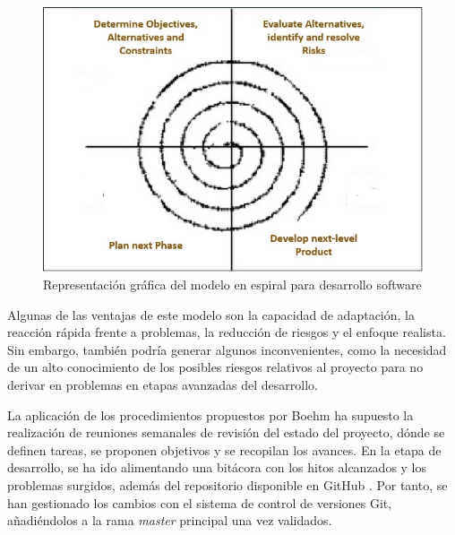 \documentclass[12pt,spanish,chapterprefix, numbers=noenddot]{book}
\numberwithin{equation}{section}
\numberwithin{figure}{section}
\begin{document}
\begin{figure}[hbt!]
\centering
\includegraphics[width=12cm]{Figs/spiral_model.jpg}
\par
\caption{\label{fig:spiralModel}Representación gráfica del modelo en espiral para desarrollo software}
\end{figure}

Algunas de las ventajas de este modelo son la capacidad de adaptación, la reacción rápida frente a problemas, la reducción de riesgos y el enfoque realista. Sin embargo, también podría generar algunos inconvenientes, como la necesidad de un alto conocimiento de los posibles riesgos relativos al proyecto para no derivar en problemas en etapas avanzadas del desarrollo. 

La aplicación de los procedimientos propuestos por Boehm ha supuesto la realización de reuniones semanales de revisión del estado del proyecto, dónde se definen tareas, se proponen objetivos y se recopilan los avances. En la etapa de desarrollo, se ha ido alimentando una bitácora \cite{pages} con los hitos alcanzados y los problemas surgidos, además del repositorio disponible en GitHub \cite{repo}. Por tanto, se han gestionado los cambios con el sistema de control de versiones Git, añadiéndolos a la rama \textit{master} principal una vez validados.  
\end{document}
